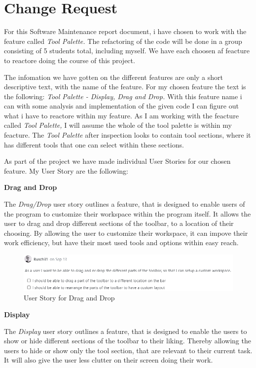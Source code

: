\section{Change Request}
For this Software Maintenance report document, i have chosen to work with the feature called \textit{Tool Palette.}
The refactoring of the code will be done in a group consisting of 5 students total, including myself. We have each choosen af feacture to reactore doing the course of this project.

The infomation we have gotten on the different features are only a short descriptive text, with the name of the feature. For my chosen feature the text is the following: \textit{Tool Palette - Display, Drag and Drop.}
With this feature name i can with some analysis and implementation of the given code I can figure out what i have to reactore within my feature.
As I am working with the feacture called \textit{Tool Palette,} I will assume the whole of the tool palette is within my feacture. The \textit{Tool Palette} after inspection looks to contain
tool sections, where it has different tools that one can select within these sections.

As part of the project we have made individual User Stories for our chosen feature. My User Story are the following:

\textbf{Drag and Drop}

The \textit{Drag/Drop} user story outlines a feature, that is designed to enable users of the program to customize their workspace within the program itself.
It allows the user to drag and drop different sections of the toolbar, to a location of their choosing.
By allowing the user to customize their workspace, it can impove their work efficiency, but have their most used tools and options within easy reach.

\begin{figure}[htbp]
    \centering
    \includegraphics[width=\linewidth]{pic/Tool_palette_Drag_and_drop.png}
    \caption{User Story for Drag and Drop}
    \label{fig:tool-palette-drag-drop}
\end{figure}

\textbf{Display}

The \textit{Display} user story outlines a feature, that is designed to enable the users to show or hide different sections of the toolbar to their liking.
Thereby allowing the users to hide or show only the tool section, that are relevant to their current task. It will also give the user less clutter on their screen doing their work.


